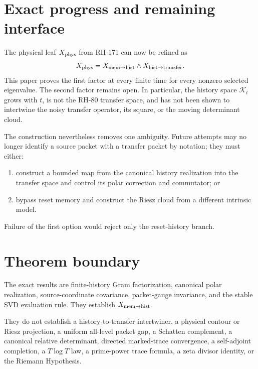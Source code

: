 \documentclass[12pt]{article}
\theoremstyle{definition}
\theoremstyle{remark}
\newcommand{\cK}{\mathcal K}
\begin{document}
\section{Exact progress and remaining interface}

The physical leaf $X_{\rm phys}$ from RH-171 can now be refined as
\begin{equation}\label{eq:x-split}
 X_{\rm phys}
 =X_{\rm mem\to hist}\wedge X_{\rm hist\to transfer}.
\end{equation}
This paper proves the first factor at every finite time for every nonzero
selected eigenvalue.  The second factor remains open.  In particular, the
history space $\cK_t$ grows with $t$, is not the RH-80 transfer space, and has
not been shown to intertwine the noisy transfer operator, its square, or the
moving determinant cloud.

The construction nevertheless removes one ambiguity.  Future attempts may
no longer identify a source packet with a transfer packet by notation; they
must either:
\begin{enumerate}[leftmargin=2em]
\item construct a bounded map from the canonical history realization into
the transfer space and control its polar correction and commutator; or
\item bypass reset memory and construct the Riesz cloud from a different
intrinsic model.
\end{enumerate}
Failure of the first option would reject only the reset-history branch.

\section{Theorem boundary}

The exact results are finite-history Gram factorization, canonical polar
realization, source-coordinate covariance, packet-gauge invariance, and the
stable SVD evaluation rule.  They establish $X_{\rm mem\to hist}$.

They do not establish a history-to-transfer intertwiner, a physical contour
or Riesz projection, a uniform all-level packet gap, a Schatten complement,
a canonical relative determinant, directed marked-trace convergence, a
self-adjoint completion, a $T\log T$ law, a prime-power trace formula, a zeta
divisor identity, or the Riemann Hypothesis.



\end{document}
